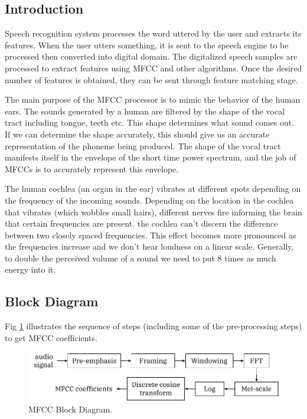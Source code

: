 \documentclass[12pt, a4paper, twoside]{report}
\begin{document}
\subsection{Introduction}
Speech recognition system processes the word uttered by the user and extracts its features. When the user utters something, it is sent to the speech engine to be processed then converted into digital domain. The digitalized speech samples are processed to extract features using MFCC and other algorithms. Once the desired number of features is obtained, they can be sent through feature matching stage.
\par
The main purpose of the MFCC processor is to mimic the behavior of the human ears. The sounds generated by a human are filtered by the shape of the vocal tract including tongue, teeth etc. This shape determines what sound comes out. If we can determine the shape accurately, this should give us an accurate representation of the phoneme being produced. The shape of the vocal tract manifests itself in the envelope of the short time power spectrum, and the job of MFCCs is to accurately represent this envelope.
\par
The human cochlea (an organ in the ear) vibrates at different spots depending on the frequency of the incoming sounds. Depending on the location in the cochlea that vibrates (which wobbles small hairs), different nerves fire informing the brain that certain frequencies are present.
the cochlea can't discern the difference between two closely spaced frequencies. This effect becomes more pronounced as the frequencies increase and we don't hear loudness on a linear scale. Generally, to double the perceived volume of a sound we need to put 8 times as much energy into it.

\subsection{Block Diagram}
Fig \ref{fig:mfcc} illustrates the sequence of steps (including some of the pre-processing steps) to get MFCC coefficients.
\begin{figure}[!h]
	\centering
	\includegraphics[]
	{images/chapter3/mfcc}
	\caption{MFCC Block Diagram.}
	\label{fig:mfcc}
\end{figure}
\end{document}
